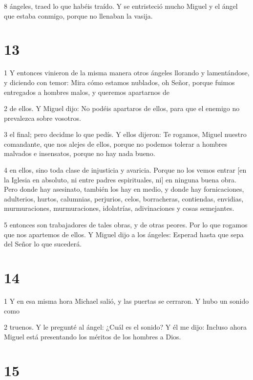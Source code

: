 \par 8 ángeles, traed lo que habéis traído. Y se entristeció mucho Miguel y el ángel que estaba conmigo, porque no llenaban la vasija.

\chapter{13}

\par 1 Y entonces vinieron de la misma manera otros ángeles llorando y lamentándose, y diciendo con temor: Mira cómo estamos nublados, oh Señor, porque fuimos entregados a hombres malos, y queremos apartarnos de

\par 2 de ellos. Y Miguel dijo: No podéis apartaros de ellos, para que el enemigo no prevalezca sobre vosotros.

\par 3 el final; pero decidme lo que pedís. Y ellos dijeron: Te rogamos, Miguel nuestro comandante, que nos alejes de ellos, porque no podemos tolerar a hombres malvados e insensatos, porque no hay nada bueno.

\par 4 en ellos, sino toda clase de injusticia y avaricia. Porque no los vemos entrar [en la Iglesia en absoluto, ni entre padres espirituales, ni] en ninguna buena obra. Pero donde hay asesinato, también los hay en medio, y donde hay fornicaciones, adulterios, hurtos, calumnias, perjurios, celos, borracheras, contiendas, envidias, murmuraciones, murmuraciones, idolatrías, adivinaciones y cosas semejantes.

\par 5 entonces son trabajadores de tales obras, y de otras peores. Por lo que rogamos que nos apartemos de ellos. Y Miguel dijo a los ángeles: Esperad hasta que sepa del Señor lo que sucederá.

\chapter{14}

\par 1 Y en esa misma hora Michael salió, y las puertas se cerraron. Y hubo un sonido como

\par 2 truenos. Y le pregunté al ángel: ¿Cuál es el sonido? Y él me dijo: Incluso ahora Miguel está presentando los méritos de los hombres a Dios.

\chapter{15}

